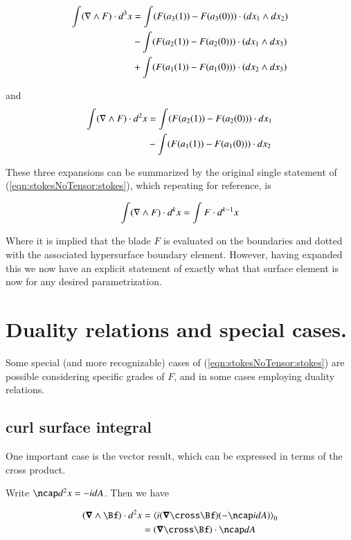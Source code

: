 \begin{align*}
\int ( \nabla \wedge F ) \cdot d^3 x 
&= \int (F(a_3(1)) - F(a_3(0))) \cdot ( dx_1 \wedge dx_2 ) \\
&- \int (F(a_2(1)) - F(a_2(0))) \cdot ( dx_1 \wedge dx_3 ) \\
&+ \int (F(a_1(1)) - F(a_1(0))) \cdot ( dx_2 \wedge dx_3 ) \\
\end{align*}

and
\begin{align*}
\int ( \nabla \wedge F ) \cdot d^2 x 
&= \int (F(a_2(1)) - F(a_2(0))) \cdot dx_1 \\
&- \int (F(a_1(1)) - F(a_1(0))) \cdot dx_2 \\
\end{align*}

These three expansions can be summarized by the original single statement of (\ref{eqn:stokesNoTensor:stokes}), which repeating for reference, is

\begin{align*}
\int ( \nabla \wedge F ) \cdot d^k x = \int F \cdot d^{k-1} x 
\end{align*}

Where it is implied that the blade $F$ is evaluated on the boundaries and dotted with the associated hypersurface boundary element.  However, having expanded this we now have an explicit statement of exactly what that surface element is now for any desired parametrization.

\section{Duality relations and special cases.}

Some special (and more recognizable) cases of (\ref{eqn:stokesNoTensor:stokes}) are possible considering specific grades of $F$, and in some cases employing duality relations.  

\subsection{curl surface integral}

One important case is the  vector result, which can be expressed in terms of the cross product.

Write $\ncap d^2 x = -i dA$.  Then we have

\begin{align*}
( \spacegrad \wedge \Bf ) \cdot d^2 x
&=
\gpgradezero{ i (\spacegrad \cross \Bf) (- \ncap i dA) } \\
&=
(\spacegrad \cross \Bf) \cdot \ncap dA
\end{align*}

